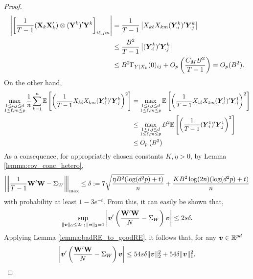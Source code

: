 \begin{proof}
    \begin{align*}
        \left|\left[\frac{1}{T-1} (\mathbf{X}_k\mathbf{X}_k') \otimes(\mathbf{Y}^k)'\mathbf{Y}^k \right]_{i\ell, jm} \right|&= \frac{1}{T-1}\left| X_{k\ell}X_{km} (\bm{Y}^{k}_{\cdot i})'\bm{Y}^{k}_{\cdot j}\right| \\
        &\leq \frac{B^2}{T-1}  \left|(\bm{Y}^{k}_{\cdot i})'\bm{Y}^{k}_{\cdot j}\right| \\
        &\leq  B^2\Gamma_{Y|X_k}(0)_{ij} + O_p\left( \frac{C_M B^2}{T-1}\right) = O_p(B^2).
    \end{align*}
    On the other hand, 
    \begin{align*}
        \max_{\substack{ 1\leq i,j\leq d \\ 1\leq \ell,m \leq p}} \frac{1}{n} \sum_{k=1}^n \mathbb{E}\left[ \left(\frac{1}{T-1} X_{k\ell}X_{km} (\bm{Y}^{k}_{\cdot i})'\bm{Y}^{k}_{\cdot j}\right)^2  \right] &= \max_{\substack{ 1\leq i,j\leq d \\ 1\leq \ell,m \leq p}} \mathbb{E}\left[ \left(\frac{1}{T-1} X_{1\ell}X_{1m} (\bm{Y}^{1}_{\cdot i})'\bm{Y}^{1}_{\cdot j}\right)^2  \right]\\ 
        &\leq \max_{\substack{ 1\leq i,j\leq d \\ 1\leq \ell,m \leq p}}  B^2 \mathbb{E}\left[ \left(\frac{1}{T-1} (\bm{Y}^{1}_{\cdot i})'\bm{Y}^{1}_{\cdot j}\right)^2  \right]\\
        &\leq O_p\left( B^2 \right)
    \end{align*}
    As a consequence, for appropriately chosen constants $K, \eta > 0 $, by Lemma \ref{lemma:cov_conc_hetero},
    \begin{equation*}
        {\left\vert\kern-0.25ex\left\vert\kern-0.25ex\left\vert  \frac{1}{T-1}\mathbf{W}'\mathbf{W}- \Sigma_W  \right\vert\kern-0.25ex\right\vert\kern-0.25ex\right\vert}_{\max} \leq \delta := 7\sqrt{\frac{\eta B^2(\log(d^2p) + t)}{ n} } + \frac{  KB^2 \log(2n)(\log(d^2p) + t) }{n}
    \end{equation*}
    with probability at least $1 - 3e^{-t}$. From this, it can easily be shown that,
    \begin{align*}
        \sup_{\substack{\|\bm{v}\|_0 \leq 2s \,;\, \|\bm{v}\|_2 = 1}} \left|\bm{v}' \left(\frac{\mathbf{W}'\mathbf{W}}{N} - \Sigma_W \right) \bm{v}\right| \leq 2s\delta.
    \end{align*}
    Applying Lemma \ref{lemma:badRE_to_goodRE}, it follows that, for any $\bm{v}\in\mathbb{R}^{pd}$
    \begin{align*}
        \left|\bm{v}' \left(\frac{\mathbf{W}'\mathbf{W}}{N} - \Sigma_W \right) \bm{v}\right| \leq 54s\delta  \|\bm{v}\|_2^2 + {54\delta} \|\bm{v}\|_1^2.
    \end{align*}
    

\end{proof}
